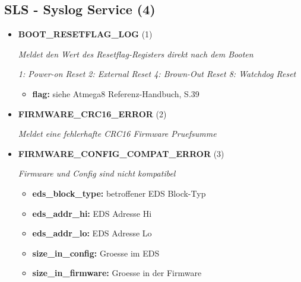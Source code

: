 \subsection{SLS - Syslog Service (4)}
\begin{itemize}
		
\item \textbf{BOOT\_RESETFLAG\_LOG} (1)

\textit{Meldet den Wert des Resetflag-Registers direkt nach dem Booten}

\textit{1: Power-on Reset 2: External Reset 4: Brown-Out Reset 8: Watchdog Reset}

\small
\begin{itemize}
		
\item \textbf{flag:} siehe Atmega8 Referenz-Handbuch, S.39
\end{itemize}
\normalsize
	
\item \textbf{FIRMWARE\_CRC16\_ERROR} (2)

\textit{Meldet eine fehlerhafte CRC16 Firmware Pruefsumme}

\item \textbf{FIRMWARE\_CONFIG\_COMPAT\_ERROR} (3)

\textit{Firmware und Config sind nicht kompatibel}

\small
\begin{itemize}
		
\item \textbf{eds\_block\_type:} betroffener EDS Block-Typ
\item \textbf{eds\_addr\_hi:} EDS Adresse Hi
\item \textbf{eds\_addr\_lo:} EDS Adresse Lo
\item \textbf{size\_in\_config:} Groesse im EDS
\item \textbf{size\_in\_firmware:} Groesse in der Firmware
\end{itemize}
\normalsize
	
\end{itemize}
	

